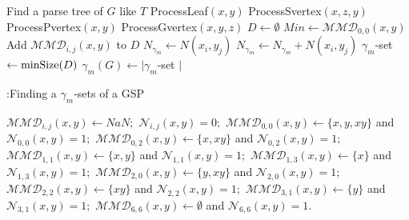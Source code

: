 \documentclass[12pt]{article}
\theoremstyle{definition}
\theoremstyle{remark}
\begin{document}
\begin{algorithm}[h!]
	\begin{algorithmic}[1]
\State Find a parse tree of $G$ like $T$
		\State ProcessLeaf$(x,y)$
		\EndCase
		\State ProcessSvertex$(x,z,y)$
		\EndCase
		\State ProcessPvertex$(x,y)$
		\EndCase
		\State ProcessGvertex$(x,y,z)$
		\EndCase
		\EndSwitch
		\EndFor
		\State $D\gets \emptyset$
		\State $Min\gets \mathcal{MMD}_{0,0}(x,y)$
		\State Add $\mathcal{MMD}_{i,j}(x,y)$ to $D$
				\State $N_{\gamma_{m}} \gets N(x_{i},y_{j})$
		\State $N_{\gamma_{m}}  \gets N_{\gamma_{m}} + N(x_{i},y_{j})$
		\EndIf
				\EndFor
		\State $\gamma_{m}$-set$\gets \mbox{minSize}(D)$
		\State $\gamma_{m}(G) \gets \vert \gamma_{m}$-set $\vert$
	\end{algorithmic}
\end{algorithm}

\begin{algorithm}[h!]
\caption{:Finding a $\gamma_{m}$-sets of a GSP}\label{findset}
	\begin{algorithmic}[1]
		\State $\mathcal{MMD}_{i,j}(x,y) \gets NaN; $
		\State $\mathcal{N}_{i,j}(x,y)=0; $
		\EndFor
		\State $\mathcal{MMD}_{0,0}(x,y)\gets \{x,y,xy\} $ and  $\mathcal{N}_{0,0}(x,y)=1; $
		\State $\mathcal{MMD}_{0,2}(x,y)\gets \{x,xy\} $ and $\mathcal{N}_{0,2}(x,y)=1; $
		\State $\mathcal{MMD}_{1,1}(x,y)\gets \{x,y\} $ and  $\mathcal{N}_{1,1}(x,y)=1; $
		\State $\mathcal{MMD}_{1,3}(x,y)\gets \{x\}$ and $\mathcal{N}_{1,3}(x,y)=1; $
		\State $\mathcal{MMD}_{2,0}(x,y)\gets \{y,xy\} $ and $\mathcal{N}_{2,0}(x,y)=1; $
		\State $\mathcal{MMD}_{2,2}(x,y)\gets \{xy\} $ and $\mathcal{N}_{2,2}(x,y)=1; $
		\State $\mathcal{MMD}_{3,1}(x,y)\gets \{y\} $ and $\mathcal{N}_{3,1}(x,y)=1; $
		\State $\mathcal{MMD}_{6,6}(x,y)\gets \emptyset $ and $\mathcal{N}_{6,6}(x,y)=1. $
				\EndProcedure
	\end{algorithmic}
\end{algorithm}
\end{document}

